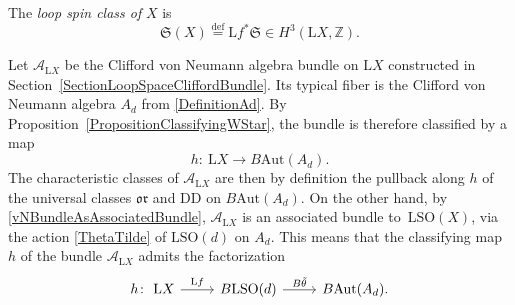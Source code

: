 \documentclass[10pt,a4paper]{amsart}
\numberwithin{equation}{section}
\newcommand{\Z}{\mathbb{Z}}
\newcommand{\A}{\mathcal{A}}
\newcommand{\SO}{\mathrm{SO}}
\newcommand{\Aut}{\mathrm{Aut}}
\renewcommand{\L}{\mathrm{L}}
\newcommand{\DD}{\mathrm{DD}}
\newcommand{\defeq}{\stackrel{\mathrm{def}}{=}}
\newcommand{\oclass}{\mathfrak{or}}
\begin{document}
\begin{Definition}
The \emph{loop spin class of} $X$ is
\begin{equation*}
\mathfrak{S}(X) \defeq \L f^* \mathfrak{S} \in H^3(\L X, \Z).
\end{equation*}
\end{Definition}

Let $\A_{\L X}$ be the Clifford von Neumann algebra bundle on $\L X$ constructed in Section~\ref{SectionLoopSpaceCliffordBundle}.
Its typical fiber is the Clifford von Neumann algebra $A_d$ from \eqref{DefinitionAd}.
By Proposition~\ref{PropositionClassifyingWStar}, the bundle is therefore classified by a map
\begin{equation*}
h\colon\ \L X \longrightarrow B\Aut(A_d).
\end{equation*}
The characteristic classes of $\A_{\L X}$ are then by definition the pullback along $h$ of the universal classes $\oclass$ and $\DD$ on $B\Aut(A_d)$. On the other hand, by \eqref{vNBundleAsAssociatedBundle}, $\A_{\L X}$ is an associated bundle to~$\L\SO(X)$, via the action \eqref{ThetaTilde} of $\L\SO(d)$ on $A_d$.
This means that the classifying map $h$ of the bundle $\A_{\L X}$ admits the factorization
\begin{equation*}
\begin{tikzcd}
 h \colon\ \L X \ar[r, "\L f"] %
 & B \L \SO(d) \ar[r, "B\tilde{\theta}"] & B\Aut(A_d).
\end{tikzcd}
\end{equation*}
\end{document}
